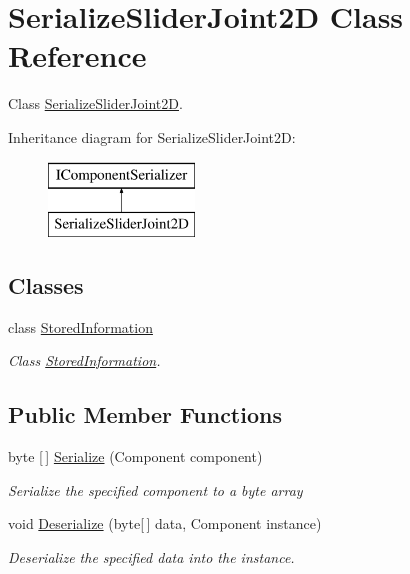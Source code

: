 \hypertarget{class_serialize_slider_joint2_d}{}\section{Serialize\+Slider\+Joint2D Class Reference}
\label{class_serialize_slider_joint2_d}


Class \hyperlink{class_serialize_slider_joint2_d}{Serialize\+Slider\+Joint2D}.  


Inheritance diagram for Serialize\+Slider\+Joint2D\+:\begin{figure}[H]
\begin{center}
\leavevmode
\includegraphics[height=2.000000cm]{class_serialize_slider_joint2_d}
\end{center}
\end{figure}
\subsection*{Classes}
\begin{DoxyCompactItemize}
\item 
class \hyperlink{class_serialize_slider_joint2_d_1_1_stored_information}{Stored\+Information}
\begin{DoxyCompactList}\small\item\em Class \hyperlink{class_serialize_slider_joint2_d_1_1_stored_information}{Stored\+Information}. \end{DoxyCompactList}\end{DoxyCompactItemize}
\subsection*{Public Member Functions}
\begin{DoxyCompactItemize}
\item 
byte \mbox{[}$\,$\mbox{]} \hyperlink{class_serialize_slider_joint2_d_ad690d87ffc29815b59900bde784a1ed3}{Serialize} (Component component)
\begin{DoxyCompactList}\small\item\em Serialize the specified component to a byte array \end{DoxyCompactList}\item 
void \hyperlink{class_serialize_slider_joint2_d_a50d76e3724e23d0acc752f75715be6e8}{Deserialize} (byte\mbox{[}$\,$\mbox{]} data, Component instance)
\begin{DoxyCompactList}\small\item\em Deserialize the specified data into the instance. \end{DoxyCompactList}\end{DoxyCompactItemize}


